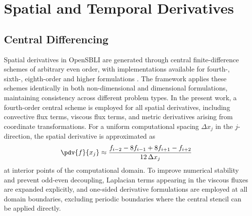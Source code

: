 

\section{Spatial and Temporal Derivatives}
\subsection{Central Differencing}
Spatial derivatives in OpenSBLI are generated through central finite-difference schemes of arbitrary even order, with implementations available for fourth-, sixth-, eighth-order and higher formulations \citep{LusherEtAl2025,RegulyMudaligeGiles2018}. The framework applies these schemes identically in both non-dimensional and dimensional formulations, maintaining consistency across different problem types. In the present work, a fourth-order central scheme is employed for all spatial derivatives, including convective flux terms, viscous flux terms, and metric derivatives arising from coordinate transformations. For a uniform computational spacing $\Delta x_j$ in the $j$-direction, the spatial derivative is approximated as
\begin{equation}
    \pdv{f}{x_j} \approx \frac{f_{i-2} - 8 f_{i-1} + 8 f_{i+1} - f_{i+2}}{12 \,\Delta x_j}
\end{equation}
at interior points of the computational domain. To improve numerical stability and prevent odd-even decoupling, Laplacian terms appearing in the viscous fluxes are expanded explicitly, and one-sided derivative formulations are employed at all domain boundaries, excluding periodic boundaries where the central stencil can be applied directly.

